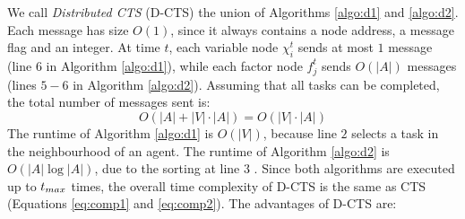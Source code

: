 We call \emph{Distributed CTS} (D-CTS) the union of Algorithms \ref{algo:d1} and
\ref{algo:d2}. Each message has size $O(1)$, since it always contains a node
address, a message flag and an integer. At time $t$, each variable node $\chi_i^t$ sends
at most $1$ message (line $6$ in Algorithm \ref{algo:d1}), while each factor node $f_j^t$
sends $O(|A|)$ messages (lines $5 - 6$ in Algorithm \ref{algo:d2}). Assuming that all
tasks can be completed, the total number of messages sent is:
\begin{equation}\label{eq:dcts-co}
    O(|A| + |V| \cdot |A|) = O(|V| \cdot |A|)
\end{equation}
The runtime of Algorithm \ref{algo:d1} is $O(|V|)$, because line $2$ selects a task in the
neighbourhood of an agent. The runtime of Algorithm \ref{algo:d2} is $O(|A| \log |A|)$,
due to the sorting at line $3$ \cite{cormen2009}.
Since both algorithms are executed up to $t_{max}$ times, the overall time complexity of
D-CTS is the same as CTS (Equations \ref{eq:comp1} and \ref{eq:comp2}).
The advantages of D-CTS are:
